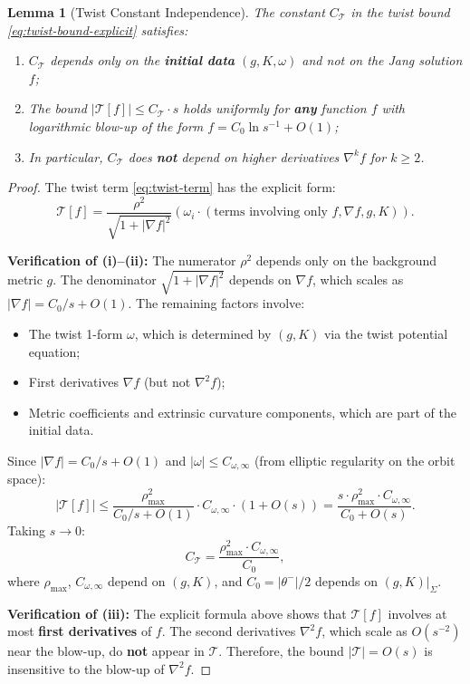 \documentclass[12pt]{article}
\theoremstyle{plain}
\newtheorem{lemma}[theorem]{Lemma}
\theoremstyle{definition}
\theoremstyle{remark}
\begin{document}
\begin{lemma}[Twist Constant Independence]\label{lem:twist-constant-independence}
The constant $C_\mathcal{T}$ in the twist bound \eqref{eq:twist-bound-explicit} satisfies:
\begin{enumerate}[label=\textup{(\roman*)}]
    \item $C_\mathcal{T}$ depends only on the \textbf{initial data} $(g, K, \omega)$ and not on the Jang solution $f$;
    \item The bound $|\mathcal{T}[f]| \leq C_\mathcal{T} \cdot s$ holds uniformly for \textbf{any} function $f$ with logarithmic blow-up of the form $f = C_0 \ln s^{-1} + O(1)$;
    \item In particular, $C_\mathcal{T}$ does \textbf{not} depend on higher derivatives $\nabla^k f$ for $k \geq 2$.
\end{enumerate}
\end{lemma}

\begin{proof}
The twist term \eqref{eq:twist-term} has the explicit form:
\[
\mathcal{T}[f] = \frac{\rho^2}{\sqrt{1 + |\nabla f|^2}} \left( \omega_i \cdot (\text{terms involving only } f, \nabla f, g, K) \right).
\]

\textbf{Verification of (i)--(ii):} The numerator $\rho^2$ depends only on the background metric $g$. The denominator $\sqrt{1 + |\nabla f|^2}$ depends on $\nabla f$, which scales as $|\nabla f| = C_0/s + O(1)$. The remaining factors involve:
\begin{itemize}
    \item The twist 1-form $\omega$, which is determined by $(g, K)$ via the twist potential equation;
    \item First derivatives $\nabla f$ (but not $\nabla^2 f$);
    \item Metric coefficients and extrinsic curvature components, which are part of the initial data.
\end{itemize}

Since $|\nabla f| = C_0/s + O(1)$ and $|\omega| \leq C_{\omega,\infty}$ (from elliptic regularity on the orbit space):
\[
|\mathcal{T}[f]| \leq \frac{\rho_{\max}^2}{C_0/s + O(1)} \cdot C_{\omega,\infty} \cdot (1 + O(s)) = \frac{s \cdot \rho_{\max}^2 \cdot C_{\omega,\infty}}{C_0 + O(s)}.
\]
Taking $s \to 0$:
\[
C_\mathcal{T} = \frac{\rho_{\max}^2 \cdot C_{\omega,\infty}}{C_0},
\]
where $\rho_{\max}$, $C_{\omega,\infty}$ depend on $(g, K)$, and $C_0 = |\theta^-|/2$ depends on $(g, K)|_\Sigma$.

\textbf{Verification of (iii):} The explicit formula above shows that $\mathcal{T}[f]$ involves at most \textbf{first derivatives} of $f$. The second derivatives $\nabla^2 f$, which scale as $O(s^{-2})$ near the blow-up, do \textbf{not} appear in $\mathcal{T}$. Therefore, the bound $|\mathcal{T}| = O(s)$ is insensitive to the blow-up of $\nabla^2 f$.
\end{proof}
\end{document}
